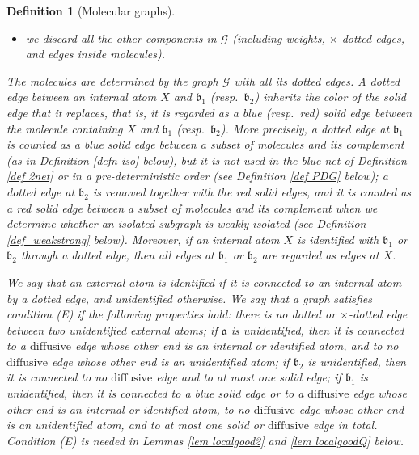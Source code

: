\documentclass{article}
\newcommand{\1}{\mathds{1}}
\numberwithin{equation}{section}
\newcommand{\fa}{{\mathfrak a}}
\newcommand{\fb}{{\mathfrak b}}
\renewcommand{\cal}{\mathcal}
\newcommand{\dashed}{\text{diffusive}}
\theoremstyle{plain} %
\newtheorem{definition}[theorem]{Definition}
\theoremstyle{remark}
\newcommand{\cor}{\color{red}}
\newcommand{\nc}{\normalcolor}
\begin{document}
\begin{definition}[Molecular graphs]
\begin{itemize}
		\item we discard all the other components in $\cal G$ (including weights, $\times$-dotted edges, and edges inside molecules).
	\end{itemize}
	The molecules are determined by the graph $\cal G$ with all its dotted edges. A dotted edge between an internal atom $X$ and $\fb_1$ (resp.~$\fb_2$) inherits the color of the solid edge that it replaces, that is, it is regarded as a blue (resp.~red) solid edge between the molecule containing $X$ and $\fb_1$ (resp.~$\fb_2$). More precisely, a dotted edge at $\fb_1$ is counted as a blue solid edge between a subset of molecules and its complement (as in Definition \ref{defn iso} below), but it is not used in the blue net of Definition \ref{def 2net} or in a pre-deterministic order (see Definition \ref{def PDG} below); a dotted edge at $\fb_2$ is removed together with the red solid edges, and it is counted as a red solid edge between a subset of molecules and its complement when we determine whether an isolated subgraph is weakly isolated (see Definition \ref{def_weakstrong} below). Moreover, if an internal atom $X$ is identified with $\fb_1$ or $\fb_2$ through a dotted edge, then all edges at $\fb_1$ or $\fb_2$ are regarded as edges at $X$.

	We say that an external atom is \emph{identified} if it is connected to an internal atom by a dotted edge, and \emph{unidentified} otherwise. We say that a graph satisfies \emph{condition (E)} if the following properties hold: there is no dotted or $\times$-dotted edge between two unidentified external atoms; if $\fa$ is unidentified, then it is connected to a $\dashed$ edge whose other end is an internal or identified atom, and to no $\dashed$ edge whose other end is an unidentified atom; if $\fb_2$ is unidentified, then it is connected to no $\dashed$ edge and to at most one solid edge; if $\fb_1$ is unidentified, then it is connected to a blue solid edge or to a $\dashed$ edge whose other end is an internal or identified atom, to no $\dashed$ edge whose other end is an unidentified atom, and to at most one solid or $\dashed$ edge in total. Condition (E) is needed in Lemmas \ref{lem localgood2} and \ref{lem localgoodQ} below.
\end{definition}
\end{document}
